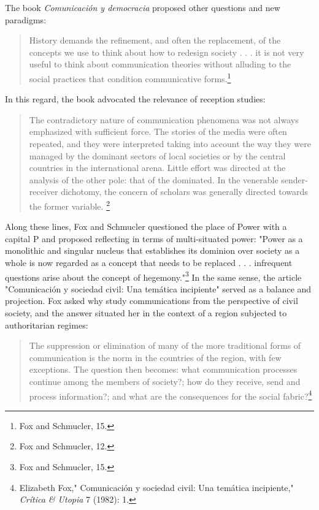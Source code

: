 \documentclass{tufte-handout}
\begin{document}
\noindent The book \emph{Comunicación y democracia} proposed other questions and
new paradigms:

\begin{quote}
History demands the refinement, and often the replacement, of the
concepts we use to think about how to redesign society . . . it is not
very useful to think about communication theories without alluding to
the social practices that condition communicative forms.\footnote{Fox
  and Schmucler, 15.}
\end{quote}

\noindent In this regard, the book advocated the relevance of reception studies:

\begin{quote}
The contradictory nature of communication phenomena was not always
emphasized with sufficient force. The stories of the media were often
repeated, and they were interpreted taking into account the way they
were managed by the dominant sectors of local societies or by the
central countries in the international arena. Little effort was directed
at the analysis of the other pole: that of the dominated. In the
venerable sender-receiver dichotomy, the concern of scholars was
generally directed towards the former variable. \footnote{Fox and
  Schmucler, 12.}
\end{quote}

\noindent Along these lines, Fox and Schmucler questioned the place of Power with
a capital P and proposed reflecting in terms of multi-situated power:
"Power as a monolithic and singular nucleus that establishes its
dominion over society as a whole is now regarded as a concept that needs
to be replaced . . . infrequent questions arise about the concept of
hegemony."\footnote{Fox and Schmucler, 15.} In the same sense, the
article "Comunicación y sociedad civil: Una temática incipiente" served
as a balance and projection. Fox asked why study communications from the
perspective of civil society, and the answer situated her in the context
of a region subjected to authoritarian regimes:

\begin{quote}
The suppression or elimination of many of the more traditional forms of
communication is the norm in the countries of the region, with few
exceptions. The question then becomes: what communication processes
continue among the members of society?; how do they receive, send and
process information?; and what are the consequences for the social
fabric?\footnote{Elizabeth Fox," Comunicación y sociedad civil: Una
  temática incipiente," \emph{Crítica \& Utopia} 7 (1982): 1.}
\end{quote}
\end{document}
